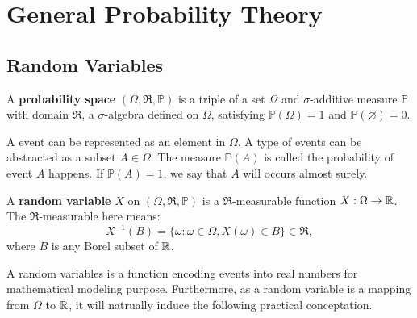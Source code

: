 
\section{General Probability Theory}

\subsection{Random Variables}
\begin{definition}
A \textbf{probability space} $(\Omega,\mathfrak{R},\mathbb{P})$ is a triple of a set $\Omega$ and $\sigma$-additive measure $\mathbb{P}$ with domain $\mathfrak{R}$, a $\sigma$-algebra defined on $\Omega$, satisfying $\mathbb{P}(\Omega) = 1$ and $\mathbb{P}(\varnothing)=0$.
\end{definition}
A event can be represented as an element in $\Omega$. A type of events can be abstracted as a subset $A\in\Omega$. The measure $\mathbb{P}(A)$ is called the probability of event $A$ happens. If $\mathbb{P}(A)=1$, we say that $A$ will occurs almost surely.

\begin{definition}
A \textbf{random variable} $X$ on $(\Omega,\mathfrak{R},\mathbb{P})$ is a $\mathfrak{R}$-measurable function $X:\Omega\to\mathbb{R}$. The $\mathfrak{R}$-measurable here means:
	\begin{equation}
		X^{-1}(B)=\{\omega:\omega\in\Omega, X(\omega)\in B\}\in\mathfrak{R},
	\end{equation}
where $B$ is any Borel subset of $\mathbb{R}$.
\end{definition}
A random variables is a function encoding events into real numbers for mathematical modeling purpose. Furthermore, as a random variable is a mapping from $\Omega$ to $\mathbb{R}$, it will natrually induce the following practical conceptation.

